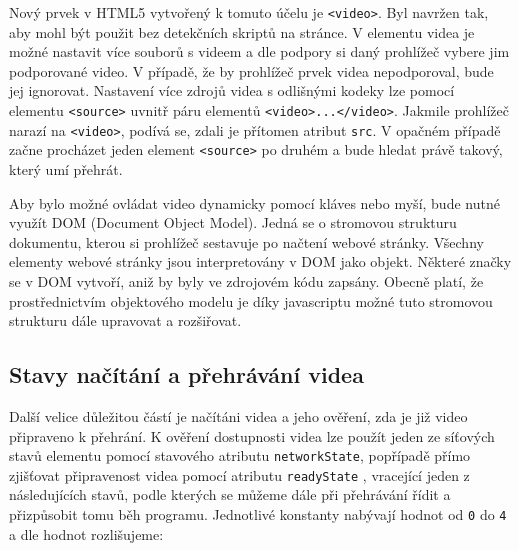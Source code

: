 Nový prvek v HTML5 vytvořený k tomuto účelu je \texttt{<video>}. Byl navržen tak, aby mohl být použit bez detekčních skriptů na stránce. V elementu videa je možné nastavit více souborů s videem a dle podpory si daný prohlížeč vybere jim podporované video. V případě, že by prohlížeč prvek videa nepodporoval, bude jej ignorovat. Nastavení více zdrojů videa s odlišnými kodeky lze pomocí elementu \texttt{<source>} uvnitř páru elementů \texttt{<video>...</video>}. Jakmile prohlížeč narazí na \texttt{<video>}, podívá se, zdali je přítomen atribut \texttt{src}. V opačném případě začne procházet jeden element \texttt{<source>} po druhém a bude hledat právě takový, který umí přehrát.

Aby bylo možné ovládat video dynamicky pomocí kláves nebo myší, bude nutné využít DOM (Document Object Model). Jedná se o stromovou strukturu dokumentu, kterou si prohlížeč sestavuje po načtení webové stránky. Všechny elementy webové stránky jsou interpretovány v DOM jako objekt. Některé značky se v DOM vytvoří, aniž by byly ve zdrojovém kódu zapsány. Obecně platí, že prostřednictvím objektového modelu je díky javascriptu možné tuto stromovou strukturu dále upravovat a rozšiřovat. 



\subsection{Stavy načítání a přehrávání videa}
Další velice důležitou částí je načítáni videa a jeho ověření, zda je již video připraveno k přehrání. K ověření dostupnosti videa lze použít jeden ze síťových stavů elementu pomocí stavového atributu \texttt{networkState}, popřípadě přímo zjišťovat připravenost videa pomocí atributu \texttt{readyState} \cite{html5}, vracející jeden z následujících stavů, podle kterých se můžeme dále při přehrávání řídit a přizpůsobit tomu běh programu. Jednotlivé konstanty nabývají hodnot od \texttt{0} do \texttt{4} a dle hodnot rozlišujeme:


